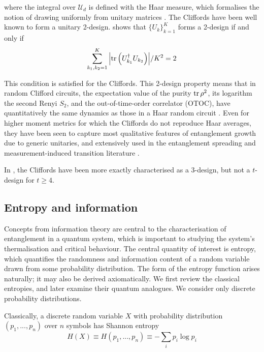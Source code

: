 \documentclass[10pt]{article}
\begin{document}
where the integral over $\mathcal{U}_d$ is defined with the Haar measure, which formalises the notion of drawing uniformly from unitary matrices \cite{dankert2009exact}. The Cliffords have been well known to form a unitary 2-design. \cite{gross2007evenly} shows that $\{U_k\}_{k=1}^K$ forms a 2-design if and only if
\begin{equation}
\sum_{k_1, k_2 = 1}^K \abs{\trace\left(U_{k_1}^\dagger U_{k_2}\right)} / K^2 = 2
\end{equation}

This condition is satisfied for the Cliffords. This 2-design property means that in random Clifford circuits, the expectation value of the purity $\trace{\rho^2}$, its logarithm the second Renyi $S_2$, and the out-of-time-order correlator (OTOC), have quantitatively the same dynamics as those in a Haar random circuit \cite{nahum2017quantum, gross2007evenly}. Even for higher moment metrics for which the Cliffords do not reproduce Haar averages, they have been seen to capture most qualitative features of entanglement growth due to generic unitaries, and extensively used in the entanglement spreading and measurement-induced transition literature \cite{chan2019unitary, li2019measurement}.

In \cite{webb2015clifford}, the Cliffords have been more exactly characterised as a 3-design, but not a $t$-design for $t\geq4$. 



\subsection{Entropy and information}

Concepts from information theory are central to the characterisation of entanglement in a quantum system, which is important to studying the system's thermalisation and critical behaviour. The central quantity of interest is entropy, which quantifies the randomness and information content of a random variable drawn from some probability distribution. The form of the entropy function arises naturally; it may also be derived axiomatically. We first review the classical entropies, and later examine their quantum analogues. We consider only discrete probability distributions.

Classically, a discrete random variable $X$ with probability distribution $(p_1,...,p_n)$ over $n$ symbols has Shannon entropy 
\begin{equation}
H(X) \equiv H(p_1, ..., p_n) \equiv -\sum_i p_i \log p_i
\end{equation}
\end{document}
